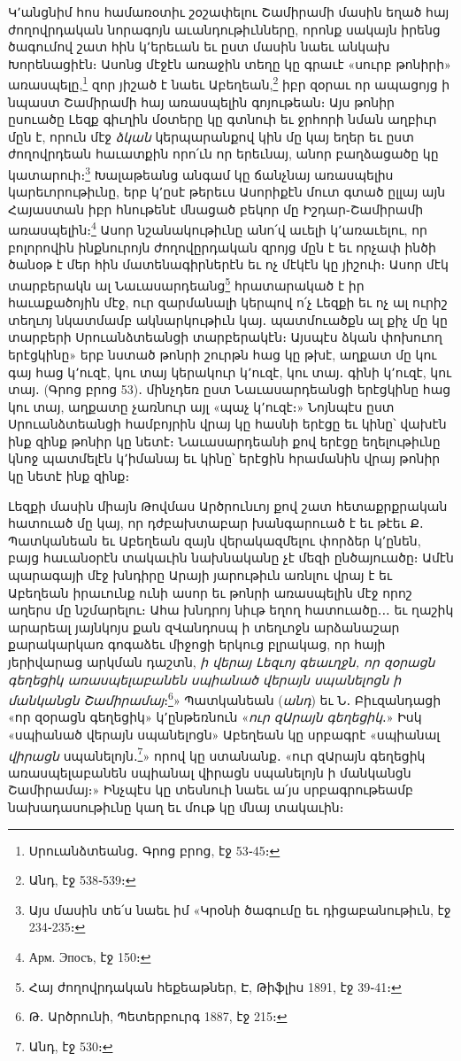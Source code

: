 \documentclass{article}
\begin{document}
{Կ՚անցնիմ հոս համառօտիւ շօշափելու Շամիրամի մասին եղած հայ ժողովրդական նորագոյն աւանդութիւնները, որոնք սակայն իրենց ծագումով շատ հին կ՚երեւան եւ ըստ մասին նաեւ անկախ Խորենացիէն։ Ասոնց մէջէն առաջին տեղը կը գրաւէ «սուրբ թոնիրի» առասպելը,\footnote{Սրուանձտեանց․ Գրոց բրոց, էջ 53֊45։} զոր յիշած է նաեւ Աբեղեան,\footnote{Անդ, էջ 538֊539։} իբր զօրաւ որ ապացոյց ի նպաստ Շամիրամի հայ առասպելին գոյութեան։ Այս թոնիր ըսուածը Լեզք գիւղին մօտերը կը գտնուի եւ ջրհորի նման աղբիւր մըն է, որուն մէջ \emph{ձկան} կերպարանքով կին մը կայ եղեր եւ ըստ ժողովրդեան հաւատքին որո՛ւն որ երեւնայ, անոր բաղձացածը կը կատարուի։\footnote{Այս մասին տե՛ս նաեւ իմ «Կրօնի ծագումը եւ դիցաբանութիւն, էջ 234֊235։} Խալաթեանց անգամ կը ճանչնայ առասպելիս կարեւորութիւնը, երբ կ՚ըսէ թերեւս Ասորիքէն մուտ գտած ըլլայ այն Հայաստան իբր հնութենէ մնացած բեկոր մը Իշդար֊Շամիրամի առասպելին։\footnote{Арм. Эпосъ, էջ 150։} Ասոր նշանակութիւնը անո՛վ աւելի կ՚առաւելու, որ բոլորովին ինքնուրոյն ժողովըրդական զրոյց մըն է եւ որչափ ինծի ծանօթ է մեր հին մատենագիրներէն եւ ոչ մէկէն կը յիշուի։ Ասոր մէկ տարբերակն ալ Նաւասարդեանց\footnote{Հայ ժողովրդական հեքեաթներ, Է, Թիֆլիս 1891, էջ 39֊41։} հրատարակած է իր հաւաքածոյին մէջ, ուր զարմանալի կերպով ո՛չ Լեզքի եւ ոչ ալ ուրիշ տեղւոյ նկատմամբ ակնարկութիւն կայ․ պատմուածքն ալ քիչ մը կը տարբերի Սրուանձտեանցի տարբերակէն։ Այսպէս ձկան փոխուող երէցկինը» երբ նստած թոնրի շուրթն հաց կը թխէ, աղքատ մը կու գայ հաց կ՚ուզէ, կու տայ կերակուր կ՚ուզէ, կու տայ․ գինի կ՚ուզէ, կու տայ․ (Գրոց բրոց 53)․ մինչդեռ ըստ Նաւասարդեանցի երէցկինը հաց կու տայ, աղքատը չառնուր այլ «պաչ կ՚ուզէ։» Նոյնպէս ըստ Սրուանձտեանցի համբոյրին վրայ կը հասնի երէցը եւ կինը՝ վախէն ինք զինք թոնիր կը նետէ։ Նաւասարդեանի քով երէցը եղելութիւնը կնոջ պատմելէն կ՚իմանայ եւ կինը՝ երէցին հրամանին վրայ թոնիր կը նետէ ինք զինք։

Լեզքի մասին միայն Թովմաս Արծրունւոյ քով շատ հետաքրքրական հատուած մը կայ, որ դժբախտաբար խանգարուած է եւ թէեւ Ք․ Պատկանեան եւ Աբեղեան զայն վերակազմելու փորձեր կ՚ընեն, բայց հաւանօրէն տակաւին նախնականը չէ մեզի ընծայուածը։ Ամէն պարագայի մէջ խնդիրը Արայի յարութիւն առնլու վրայ է եւ Աբեղեան իրաւունք ունի ասոր եւ թոնրի առասպելին մէջ որոշ աղերս մը նշմարելու։ Ահա խնդրոյ նիւթ եղող հատուածը․․․ եւ ղաշիկ արարեալ յայնկոյս քան զՎանդոսպ ի տեղւոջն արձանաշար քարակարկառ գոգաձեւ միջոցի երկուց բլրակաց, որ հայի յերիվարաց արկման դաշտն, \emph{ի վերայ Լեզւոյ գեաւղջն, որ զօրացն գեղեցիկ առասպելաբանեն սպիանած վերայն սպանելոցն ի մանկանցն Շամիրամայ}։\footnote{Թ․ Արծրունի, Պետերբուրգ 1887, էջ 215։}» Պատկանեան (\emph{անդ}) եւ Ն․ Բիւզանդացի «որ զօրացն գեղեցիկ» կ՚ընթեռնուն «\emph{ուր զԱրայն գեղեցիկ}․» Իսկ «սպիանած վերայն սպանելոցն» Աբեղեան կը սրբագրէ «սպիանալ \emph{վիրացն} սպանելոյն․\footnote{Անդ, էջ 530։}» որով կը ստանանք․ «ուր զԱրայն գեղեցիկ առասպելաբանեն սպիանալ վիրացն սպանելոյն ի մանկանցն Շամիրամայ։» Ինչպէս կը տեսնուի նաեւ ա՛յս սրբագրութեամբ նախադասութիւնը կաղ եւ մութ կը մնայ տակաւին։

}
\end{document}

